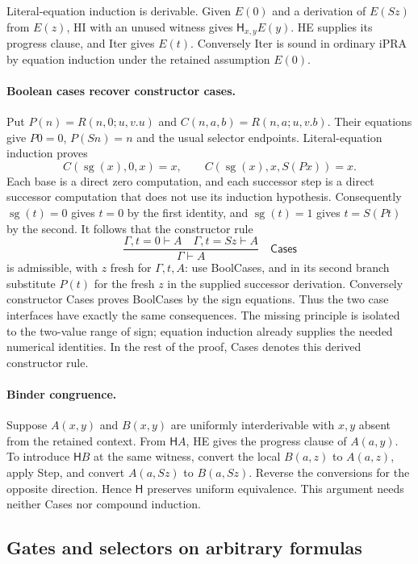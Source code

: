 Literal-equation induction is derivable.  Given $E(0)$ and a derivation
of $E(Sz)$ from $E(z)$, HI with an unused witness gives
$\mathsf H_{x,y}E(y)$.  HE supplies its progress clause, and Iter
gives $E(t)$.  Conversely Iter is sound in ordinary iPRA by equation
induction under the retained assumption $E(0)$.

\paragraph{Boolean cases recover constructor cases.}
Put $P(n)=R(n,0;u,v.u)$ and $C(n,a,b)=R(n,a;u,v.b)$.
Their equations give $P0=0$, $P(Sn)=n$ and the usual selector
endpoints.  Literal-equation induction proves
\[
 C(\operatorname{sg}(x),0,x)=x,\qquad
 C(\operatorname{sg}(x),x,S(Px))=x.
 \tag{Boolean coverage identities}
\]
Each base is a direct zero computation, and each successor step is a
direct successor computation that does not use its induction hypothesis.
Consequently $\operatorname{sg}(t)=0$ gives $t=0$ by the first
identity, and $\operatorname{sg}(t)=1$ gives $t=S(Pt)$ by the second.
It follows that the constructor rule
\[
 \frac{\Gamma,t=0\vdash A\quad\Gamma,t=Sz\vdash A}
      {\Gamma\vdash A}
 \quad\mathsf{Cases}
\]
is admissible, with $z$ fresh for $\Gamma,t,A$: use BoolCases, and
in its second branch substitute $P(t)$ for the fresh $z$ in the
supplied successor derivation.  Conversely constructor Cases proves
BoolCases by the sign equations.  Thus the two case interfaces have
exactly the same consequences.  The missing principle is isolated to
the two-value range of sign; equation induction already supplies the
needed numerical identities.  In the rest of the proof, Cases denotes
this derived constructor rule.

\paragraph{Binder congruence.}
Suppose $A(x,y)$ and $B(x,y)$ are uniformly interderivable with
$x,y$ absent from the retained context.  From $\mathsf H A$, HE gives
the progress clause of $A(a,y)$.  To introduce $\mathsf H B$ at
the same witness, convert the local $B(a,z)$ to $A(a,z)$, apply Step,
and convert $A(a,Sz)$ to $B(a,Sz)$.  Reverse the conversions for the
opposite direction.  Hence $\mathsf H$ preserves uniform equivalence.
This argument needs neither Cases nor compound induction.

\subsection{Gates and selectors on arbitrary formulas}


